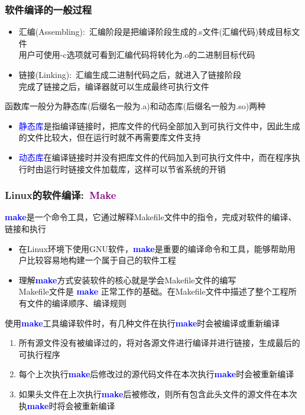 \frame
{
	\frametitle{软件编译的一般过程}
\begin{itemize}
	\item 汇编\textrm{(Assembling)}:~汇编阶段是把编译阶段生成的\textrm{.s}文件(汇编代码)转成目标文件\\
		用户可使用\textrm{-c}选项就可看到汇编代码将转化为\textrm{.o}的二进制目标代码
	\item 链接\textrm{(Linking)}:~汇编生成二进制代码之后，就进入了链接阶段\\
完成了链接之后，编译器就可以生成最终可执行文件
\end{itemize}

		函数库一般分为静态库(后缀名一般为\textrm{.a})和动态库(后缀名一般为\textrm{.so})两种
		\begin{itemize}
			\item \textcolor{blue}{静态库}是指编译链接时，把库文件的代码全部加入到可执行文件中，因此生成的文件比较大，但在运行时就不再需要库文件支持
			\item \textcolor{blue}{动态库}在编译链接时并没有把库文件的代码加入到可执行文件中，而在程序执行时由运行时链接文件加载库，这样可以节省系统的开销
		\end{itemize}
}

\frame
{
	\frametitle{\textrm{Linux}的软件编译:~\textcolor{purple}{\textbf{Make}}}
	\textcolor{blue}{\textbf{make}}是一个命令工具，它通过解释\textrm{Makefile}文件中的指令，完成对软件的编译、链接和执行
	\begin{itemize}
		\item 在\textrm{Linux}环境下使用\textrm{GNU}软件，\textcolor{blue}{\textbf{make}}是重要的编译命令和工具，能够帮助用户比较容易地构建一个属于自己的软件工程
		\item 理解\textcolor{blue}{\textbf{make}}方式安装软件的核心就是学会\textrm{Makefile}文件的编写\\
			\textrm{Makefile}文件是 \textcolor{blue}{\textbf{make}} 正常工作的基础。在\textrm{Makefile}文件中描述了整个工程所有文件的编译顺序、编译规则
	\end{itemize}
	使用\textcolor{blue}{\textbf{make}}工具编译软件时，有几种文件在执行\textcolor{blue}{\textbf{make}}时会被编译或重新编译
	\begin{enumerate}
		\item 所有源文件没有被编译过的，将对各源文件进行编译并进行链接，生成最后的可执行程序
		\item 每个上次执行\textcolor{blue}{\textbf{make}}后修改过的源代码文件在本次执行\textcolor{blue}{\textbf{make}}时会被重新编译
		\item 如果头文件在上次执行\textcolor{blue}{\textbf{make}}后被修改，则所有包含此头文件的源文件在本次执\textcolor{blue}{\textbf{make}}时将会被重新编译
	\end{enumerate}
}

